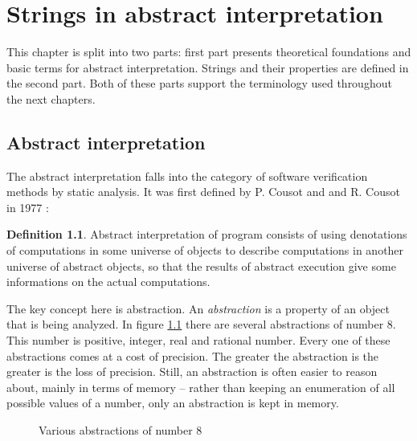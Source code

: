 \documentclass[12pt,final,oneside]{fithesis2}
\theoremstyle{definition}
\newtheorem{definition}{Definition}
\begin{document}
\chapter{Strings in abstract interpretation}
\label{chap:preliminaries}

This chapter is split into two parts:
first part presents theoretical foundations and basic terms for
abstract interpretation. Strings and their properties are defined in the
second part. Both of these parts support the terminology used throughout
the next chapters.


\section{Abstract interpretation}
\label{sec:abstractinterpretation}

The abstract interpretation falls into the category of software
verification methods by static analysis. It was first defined by P. Cousot
and and R. Cousot in 1977 \cite{CousotCousot77-1}:

\begin{definition}
Abstract interpretation of program consists of using denotations of
computations in some universe of objects to describe computations in
another universe of abstract objects, so that the results of abstract
execution give some informations on the actual computations.
\end{definition}

The key concept here is abstraction. An \textit{abstraction} is a property
of an object that is being analyzed. In figure \ref{fig:abstraction}
there are several abstractions of number 8. This number is positive,
integer, real and rational number. Every one of these abstractions comes
at a cost of precision. The greater the abstraction is the greater is the
loss of precision. Still, an abstraction is often easier to reason about,
mainly in terms of memory -- rather than keeping an enumeration of all
possible values of a number, only an abstraction is kept in memory.

\begin{figure}[ht]
\centering
{}
\caption{Various abstractions of number 8}
\label{fig:abstraction}
\end{figure}
\end{document}
